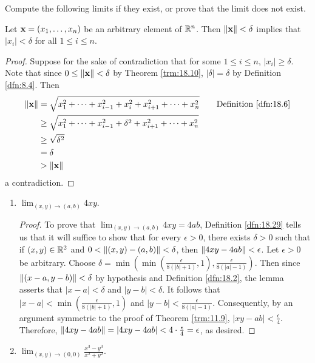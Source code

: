 \documentclass[../main.tex]{subfiles}
\begin{document}
\begin{exercise}\label{exr:18.30}
    Compute the following limits if they exist, or prove that the limit does not exist.
    \begin{lemma*}
        Let $\mathbf{x}=(x_1,\dots,x_n)$ be an arbitrary element of $\mathbb{R}^n$. Then $\norm{\mathbf{x}}<\delta$ implies that $|x_i|<\delta$ for all $1\leq i\leq n$.
        \begin{proof}
            Suppose for the sake of contradiction that for some $1\leq i\leq n$, $|x_i|\geq\delta$. Note that since $0\leq\norm{\mathbf{x}}<\delta$ by Theorem \ref{trm:18.10}, $|\delta|=\delta$ by Definition \ref{dfn:8.4}. Then
            \begin{align*}
                \norm{\x} &= \sqrt{x_1^2+\cdots+x_{i-1}^2+x_i^2+x_{i+1}^2+\cdots+x_n^2}\tag*{Definition \ref{dfn:18.6}}\\
                &\geq \sqrt{x_1^2+\cdots+x_{i-1}^2+\delta^2+x_{i+1}^2+\cdots+x_n^2}\\
                &\geq \sqrt{\delta^2}\\
                &= \delta\\
                &> \norm{\x}
            \end{align*}
            a contradiction.
        \end{proof}
    \end{lemma*}
    \begin{enumerate}[label={(\alph*)},ref={\theexercise\alph*}]
        \item \label{exr:18.30a}$\lim_{(x,y)\to(a,b)}4xy$.
        \begin{proof}
            To prove that $\lim_{(x,y)\to(a,b)}4xy=4ab$, Definition \ref{dfn:18.29} tells us that it will suffice to show that for every $\epsilon>0$, there exists $\delta>0$ such that if $(x,y)\in\mathbb{R}^2$ and $0<\norm{(x,y)-(a,b)}<\delta$, then $\norm{4xy-4ab}<\epsilon$. Let $\epsilon>0$ be arbitrary. Choose $\delta=\min(\min(\frac{\epsilon}{8(|b|+1)},1),\frac{\epsilon}{8(|a|-1)})$. Then since $\norm{(x-a,y-b)}<\delta$ by hypothesis and Definition \ref{dfn:18.2}, the lemma asserts that $|x-a|<\delta$ and $|y-b|<\delta$. It follows that $|x-a|<\min(\frac{\epsilon}{8(|b|+1)},1)$ and $|y-b|<\frac{\epsilon}{8(|a|-1)}$. Consequently, by an argument symmetric to the proof of Theorem \ref{trm:11.9}, $|xy-ab|<\frac{\epsilon}{4}$. Therefore, $\norm{4xy-4ab}=|4xy-4ab|<4\cdot\frac{\epsilon}{4}=\epsilon$, as desired.
        \end{proof}
        \item \label{exr:18.30b}$\lim_{(x,y)\to(0,0)}\frac{x^3-y^3}{x^2+y^2}$.

\end{enumerate}
\end{exercise}
\end{document}
